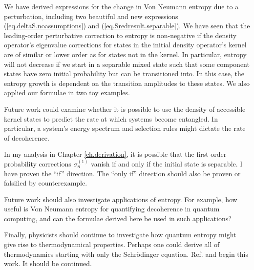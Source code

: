 We have derived expressions for the change in Von Neumann entropy due to a perturbation, including two beautiful and new expressions (\ref{eq.deltaS.noassumptions}) and (\ref{eq.Sredresult.separable}). We have seen that the leading-order perturbative correction to entropy is non-negative if the density operator's eigenvalue corrections for states in the initial density operator's kernel are of similar or lower order as for states not in the kernel. In particular, entropy will not decrease if we start in a separable mixed state such that some component states have zero initial probability but can be transitioned into. In this case, the entropy growth is dependent on the transition amplitudes to these states. We also applied our formulae in two toy examples.

Future work could examine whether it is possible to use the density of accessible kernel states to predict the rate at which systems become entangled. In particular, a system’s energy spectrum and selection rules might dictate the rate of decoherence.

In my analysis in Chapter \ref{ch.derivation}, it is possible that the first order-probability corrections \(\sigma_n^{(1)}\) vanish if and only if the initial state is separable. I have proven the ``if'' direction. The ``only if'' direction should also be proven or falsified by counterexample.

Future work should also investigate applications of entropy. For example, how useful is Von Neumann entropy for quantifying decoherence in quantum computing, and can the formulae derived here be used in such applications? 

Finally, physicists should continue to investigate how quantum entropy might give rise to thermodynamical properties. Perhaps one could derive all of thermodynamics starting with only the Schrödinger equation. Ref. \cite{bracken} and \cite{heusler} begin this work. It should be continued.
